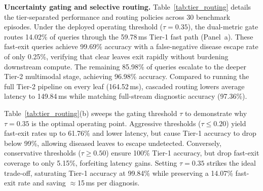 \documentclass[preprint,12pt]{elsarticle}
\begin{document}
\textbf{Uncertainty gating and selective routing.} Table~\ref{tab:tier_routing} details the tier-separated performance and routing policies across 30 benchmark episodes. Under the deployed operating threshold ($\tau=0.35$), the dual-metric gate routes 14.02\% of queries through the 59.78\,ms Tier-1 fast path (Panel~a). These fast-exit queries achieve 99.69\% accuracy with a false-negative disease escape rate of only 0.25\%, verifying that clear leaves exit rapidly without burdening downstream compute. The remaining 85.98\% of queries escalate to the deeper Tier-2 multimodal stage, achieving 96.98\% accuracy. Compared to running the full Tier-2 pipeline on every leaf (164.52\,ms), cascaded routing lowers average latency to 149.84\,ms while matching full-stream diagnostic accuracy (97.36\%).

Table~\ref{tab:tier_routing}(b) sweeps the gating threshold $\tau$ to demonstrate why $\tau=0.35$ is the optimal operating point. Aggressive thresholds ($\tau \le 0.20$) yield fast-exit rates up to 61.76\% and lower latency, but cause Tier-1 accuracy to drop below 99\%, allowing diseased leaves to escape undetected. Conversely, conservative thresholds ($\tau \ge 0.50$) ensure 100\% Tier-1 accuracy, but drop fast-exit coverage to only 5.15\%, forfeiting latency gains. Setting $\tau = 0.35$ strikes the ideal trade-off, saturating Tier-1 accuracy at 99.84\% while preserving a 14.07\% fast-exit rate and saving $\approx$15\,ms per diagnosis.
\end{document}
